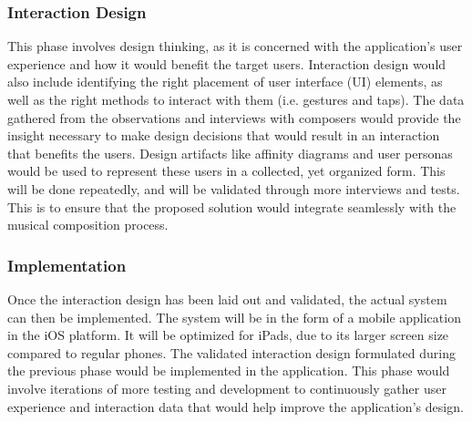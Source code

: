 \subsubsection{Interaction Design}
This phase involves design thinking, as it is concerned with the application's user experience and how it would benefit the target users. Interaction design would also include identifying the right placement of user interface (UI) elements, as well as the right methods to interact with them (i.e. gestures and taps). The data gathered from the observations and interviews with composers would provide the insight necessary to make design decisions that would result in an interaction that benefits the users. Design artifacts like affinity diagrams and user personas would be used to represent these users in a collected, yet organized form. This will be done repeatedly, and will be validated through more interviews and tests. This is to ensure that the proposed solution would integrate seamlessly with the musical composition process.


\subsubsection{Implementation}
Once the interaction design has been laid out and validated, the actual system can then be implemented. The system will be in the form of a mobile application in the iOS platform. It will be optimized for iPads, due to its larger screen size compared to regular phones. The validated interaction design formulated during the previous phase would be implemented in the application. This phase would involve iterations of more testing and development to continuously gather user experience and interaction data that would help improve the application's design.


